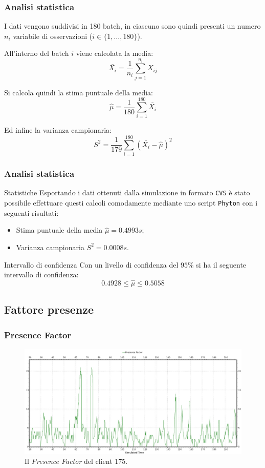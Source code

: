 \begin{frame}
\frametitle{Analisi statistica}
I dati vengono suddivisi in 180 batch, in ciascuno sono quindi presenti un
numero $n_i$ variabile di osservazioni ($i \in \{1, \ldots, 180\}$).

All'interno del batch $i$ viene calcolata la media:
\[
\bar{X_i} = \frac{1}{n_i} \sum_{j=1}^{n_i} X_{ij}
\]

Si calcola quindi la stima puntuale della media:
\[
\hat{\mu} = \frac{1}{180}\sum_{i=1}^{180}\bar{X_i}
\]

Ed infine la varianza campionaria:
\[
S^2 = \frac{1}{179} \sum_{i=1}^{180}\left( \bar{X_i} - \hat{\mu}\right)^2
\]
\end{frame}

\begin{frame}
\frametitle{Analisi statistica}
\begin{block}{Statistiche}
Esportando i dati ottenuti dalla simulazione in formato \texttt{CVS} è stato
possibile effettuare questi calcoli comodamente mediante uno script
\texttt{Phyton} con i seguenti risultati:
\begin{itemize}
\item
Stima puntuale della media $\hat{\mu} = 0.4993s$;
\item
Varianza campionaria $S^2 = 0.0008s$.
\end{itemize}
\end{block}
\pause
\vfill
\begin{exampleblock}{Intervallo di confidenza}
Con un livello di confidenza del $95$\% si ha il seguente intervallo di
confidenza:
\[
0.4928 \le \hat{\mu} \le 0.5058
\]
\end{exampleblock}
\end{frame}

\subsection*{Fattore presenze}

\begin{frame}
\frametitle{Presence Factor}
\begin{figure}
\begin{center}
\includegraphics[scale=0.34]{presence.jpeg}
\end{center}
\caption{Il \emph{Presence Factor} del client 175.}
\label{presence}
\end{figure}
\end{frame}

